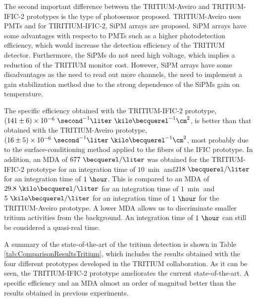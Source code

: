 \begin{enumerate}
The second important difference between the TRITIUM-Aveiro and TRITIUM-IFIC-2 prototypes is the type of photosensor proposed. TRITIUM-Aveiro uses PMTs and for TIRITIUM-IFIC-2, SiPM arrays are proposed. SiPM arrays have some advantages with respecto to PMTs such as a higher photodetection efficiency, which would increase the detection efficiency of the TRITIUM detector. Furthermore, the SiPMs do not need high voltage, which implies a reduction of the TRITIUM monitor cost. However, SiPM arrays have some disadvantages as the need to read out more channels, the need to implement a gain stabilization method due to the strong dependence of the SiPMs gain on temperature.

The specific efficiency obtained with the TRITIUM-IFIC-2 prototype, $(141 \pm 6) \times 10^{-6}~ \second^{-1}  \liter ~ \kilo\becquerel^{-1} \cm^2$, is better than that obtained with the TRITIUM-Aveiro prototype, $(16 \pm 5)\times 10^{-6}~ \second^{-1}  \liter ~ \kilo\becquerel^{-1} \cm^2$, most probably due to the surface-conditioning method applied to the fibers of the IFIC prototype. In addition, an MDA of $677~\becquerel/\liter$ was obtained for the TRITIUM-IFIC-2 prototype for an integration time of $10~\min$ and$218~\becquerel/\liter$ for an integration time of $1~\hour$. This is compared to an MDA of $29.8~\kilo\becquerel/\liter$ for an integration time of $1~\min$ and $5~\kilo\becquerel/\liter$ for an integration time of $1~\hour$ for the TRITIUM-Aveiro prototype. A lower MDA allows us to discriminate smaller tritium activities from the background. An integration time of $1~\hour$ can still be considered a quasi-real time.

A summary of the state-of-the-art of the tritium detection is shown in Table \ref{tab:ComparisonResultsTritium}, which includes the results obtained with the four different prototypes developed in the TRITIUM collaboration. As it can be seen, the TRITIUM-IFIC-2 prototype ameliorates the current state-of-the-art. A specific efficiency and an MDA almost an order of magnitud better than the results obtained in previous experiments.


\end{enumerate}
